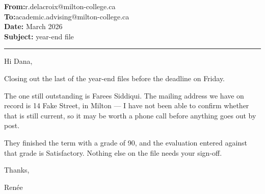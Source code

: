 \documentclass[11pt]{article}
\begin{document}
{\small
\textbf{From:}\quad r.delacroix@milton-college.ca\\
\textbf{To:}\qquad academic.advising@milton-college.ca\\
\textbf{Date:} March 2026\\
\textbf{Subject:} year-end file
}

\vspace{0.5em}
\hrule
\vspace{1.5em}

Hi Dana,

Closing out the last of the year-end files before the deadline on Friday.

The one still outstanding is Farees Siddiqui. The mailing address we have on
record is 14 Fake Street, in Milton --- I have not been able to confirm whether
that is still current, so it may be worth a phone call before anything goes out
by post.

They finished the term with a grade of 90, and the evaluation entered against
that grade is Satisfactory. Nothing else on the file needs your sign-off.

Thanks,

Ren\'ee
\end{document}
